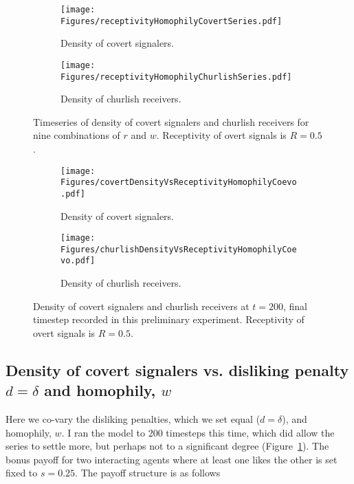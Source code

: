 \documentclass[11pt,letterpaper]{article}
\begin{document}
\begin{figure}[H]

  \centering
  \begin{subfigure}{0.49\textwidth}
    \centering
    \texttt{[image: Figures/receptivityHomophilyCovertSeries.pdf]}
    \caption{Density of covert signalers.}
  \end{subfigure}
  \begin{subfigure}{0.49\textwidth}
    \centering
    \texttt{[image: Figures/receptivityHomophilyChurlishSeries.pdf]}
    \caption{Density of churlish receivers.}
  \end{subfigure}
  
  \caption{Timeseries of density of covert signalers and churlish receivers
    for nine combinations of $r$ and $w$. Receptivity of
    overt signals is $R=0.5$.}
  \label{fig:dislikingHomophilySeries}
\end{figure}

\begin{figure}[H]
  \centering
  \begin{subfigure}{0.49\textwidth}
    \centering
    \texttt{[image: Figures/covertDensityVsReceptivityHomophilyCoevo.pdf]}
    \caption{Density of covert signalers.}
  \end{subfigure}
  \begin{subfigure}{0.49\textwidth}
    \centering
    \texttt{[image: Figures/churlishDensityVsReceptivityHomophilyCoevo.pdf]}
    \caption{Density of churlish receivers.}
  \end{subfigure}
  
  \caption{Density of covert signalers and churlish receivers at $t=200$, 
    final timestep recorded in this preliminary experiment. Receptivity of
    overt signals is $R=0.5$.}
  \label{fig:dislikingHomophilyHeatmap}
\end{figure}


\subsection*{Density of covert signalers vs. disliking penalty $d=\delta$ and homophily, $w$}

Here we co-vary the disliking penalties, which we set equal ($d=\delta$), and
homophily, $w$. I ran the model to 200 timesteps this time, which did allow
the series to settle more, but perhaps not to a significant degree 
(Figure~\ref{fig:dislikingHomophilySeries}). The bonus payoff for two 
interacting agents where at least one
likes the other is set fixed to $s=0.25$. The payoff structure is as follows
\end{document}
